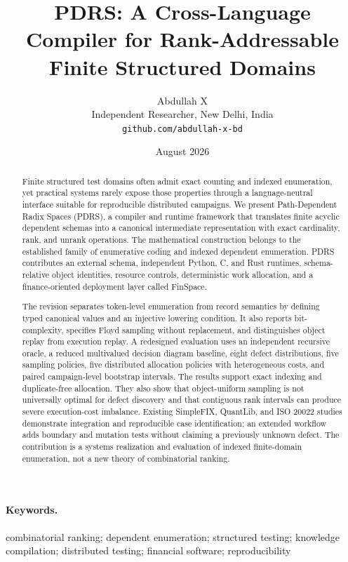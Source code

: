 \documentclass[10pt]{article}
\title{PDRS: A Cross-Language Compiler for Rank-Addressable Finite Structured Domains}
\author{Abdullah X\\Independent Researcher, New Delhi, India\\\texttt{github.com/abdullah-x-bd}}
\date{August 2026}
\begin{document}
\maketitle

\begin{abstract}
Finite structured test domains often admit exact counting and indexed enumeration, yet practical systems rarely expose those properties through a language-neutral interface suitable for reproducible distributed campaigns. We present Path-Dependent Radix Spaces (PDRS), a compiler and runtime framework that translates finite acyclic dependent schemas into a canonical intermediate representation with exact cardinality, rank, and unrank operations. The mathematical construction belongs to the established family of enumerative coding and indexed dependent enumeration. PDRS contributes an external schema, independent Python, C, and Rust runtimes, schema-relative object identities, resource controls, deterministic work allocation, and a finance-oriented deployment layer called FinSpace.

The revision separates token-level enumeration from record semantics by defining typed canonical values and an injective lowering condition. It also reports bit-complexity, specifies Floyd sampling without replacement, and distinguishes object replay from execution replay. A redesigned evaluation uses an independent recursive oracle, a reduced multivalued decision diagram baseline, eight defect distributions, five sampling policies, five distributed allocation policies with heterogeneous costs, and paired campaign-level bootstrap intervals. The results support exact indexing and duplicate-free allocation. They also show that object-uniform sampling is not universally optimal for defect discovery and that contiguous rank intervals can produce severe execution-cost imbalance. Existing SimpleFIX, QuantLib, and ISO 20022 studies demonstrate integration and reproducible case identification; an extended workflow adds boundary and mutation tests without claiming a previously unknown defect. The contribution is a systems realization and evaluation of indexed finite-domain enumeration, not a new theory of combinatorial ranking.
\end{abstract}

\paragraph{Keywords.} combinatorial ranking; dependent enumeration; structured testing; knowledge compilation; distributed testing; financial software; reproducibility
\end{document}
